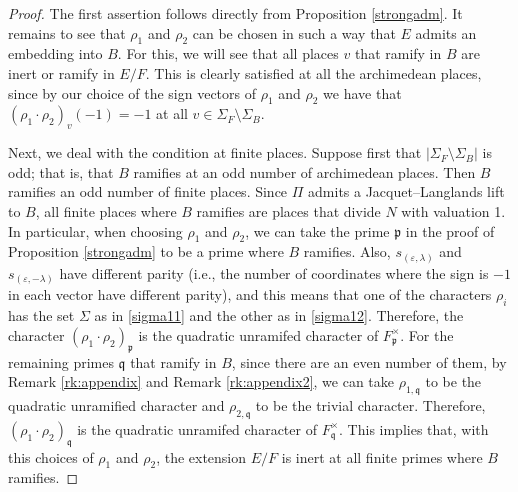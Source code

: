 \documentclass{amsart}
\theoremstyle{definition}
\theoremstyle{remark}
\numberwithin{equation}{section}
\newcommand{\fp}{{\mathfrak{p}}}
\newcommand{\fq}{{\mathfrak{q}}}
\begin{document}
\begin{proof}
  The first assertion follows directly from Proposition \ref{strongadm}. It remains to see that $\rho_1$ and $\rho_2$ can be chosen in such a way that $E$ admits an embedding into $B$. For this, we will see that all places $v$ that ramify in $B$ are inert or ramify in $E/F$. This is clearly satisfied at all the archimedean places, since by our choice of the sign vectors of $\rho_1$ and $\rho_2$ we have that $(\rho_1\cdot\rho_2)_v(-1)=-1$ at all $v\in\Sigma_F\setminus \Sigma_B$.

  Next, we deal with the condition at finite places. Suppose first that $|\Sigma_F\setminus\Sigma_B|$ is odd; that is, that $B$ ramifies at an odd number of archimedean places. Then $B$ ramifies an odd number of finite places. Since $\Pi$ admits a Jacquet--Langlands lift to $B$, all finite places where $B$ ramifies are places that divide $N$ with valuation 1. In particular, when choosing $\rho_1$ and $\rho_2$, we can take the prime $\fp$ in the proof of Proposition \ref{strongadm} to be a prime where $B$ ramifies. Also, $s_{(\varepsilon,\lambda)}$ and $s_{(\varepsilon,-\lambda)}$ have different parity (i.e., the number of coordinates where the sign is $-1$ in each vector have different parity), and this means that one of the characters $\rho_i$  has the set $\Sigma$ as in \eqref{sigma11} and the other as in \eqref{sigma12}. Therefore, the character $(\rho_1\cdot\rho_2)_\fp$ is the quadratic unramifed character of $F_\fp^\times$. For the remaining primes $\fq$ that ramify in $B$, since there are an even number of them, by Remark \ref{rk:appendix} and Remark \ref{rk:appendix2}, we can take $\rho_{1,\fq}$ to be the quadratic unramified character and $\rho_{2,\fq}$ to be the trivial character. Therefore, $(\rho_1\cdot\rho_2)_\fq$ is the quadratic unramifed character of $F_\fq^\times$.  This implies that, with this choices of $\rho_1$ and $\rho_2$, the extension $E/F$ is inert at all finite primes where $B$ ramifies.




\end{proof}
\end{document}
